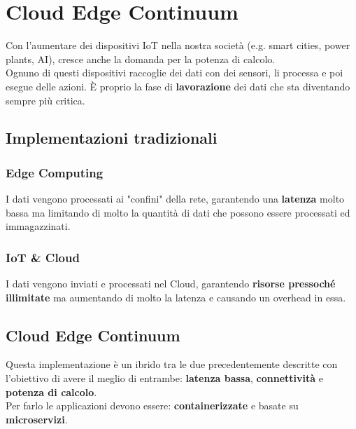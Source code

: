 \newpage
\section{Cloud Edge Continuum}
Con l'aumentare dei dispositivi IoT nella nostra società (e.g. smart cities, power plants, AI), cresce anche la domanda per la potenza di calcolo. \\
Ognuno di questi dispositivi raccoglie dei dati con dei sensori, li processa e poi esegue delle azioni. È proprio la fase di \textbf{lavorazione} dei dati che sta diventando sempre più critica.
\subsection{Implementazioni tradizionali}
\subsubsection{Edge Computing}
I dati vengono processati ai "confini" della rete, garantendo una \textbf{latenza} molto bassa ma limitando di molto la quantità di dati che possono essere processati ed immagazzinati.
\subsubsection{IoT \& Cloud}
I dati vengono inviati e processati nel Cloud, garantendo \textbf{risorse pressoché illimitate} ma aumentando di molto la latenza e causando un overhead in essa. 
\subsection{Cloud Edge Continuum}
Questa implementazione è un ibrido tra le due precedentemente descritte con l'obiettivo di avere il meglio di entrambe: \textbf{latenza bassa}, \textbf{connettività} e \textbf{potenza di calcolo}.\\
Per farlo le applicazioni devono essere: \textbf{containerizzate} e basate su \textbf{microservizi}.
